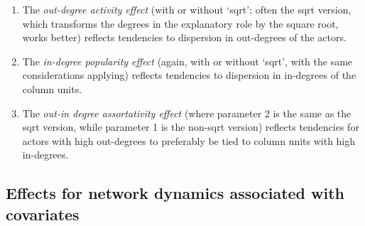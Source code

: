 \documentclass[a4paper,fleqn,11pt]{article}
\newcommand{\+}{\, + \,}
\begin{document}
\begin{enumerate}
\item The \emph{out-degree activity effect} (with or without `sqrt'; often the sqrt
     version, which transforms the degrees in the explanatory role by the square root, works better)
     reflects tendencies to dispersion in out-degrees of the actors.
\item The \emph{in-degree popularity effect} (again, with or without `sqrt',
     with the same considerations applying)
     reflects tendencies to dispersion in in-degrees of the column units.
\item The \emph{out-in degree assortativity effect} (where parameter 2 is the same
    as the sqrt version, while parameter 1 is the non-sqrt version)
     reflects tendencies for actors with high out-degrees
     to preferably be tied to column units with high in-degrees.
\end{enumerate}

\subsection{Effects for network dynamics associated with covariates}
\label{S_eff_cov}
\end{document}
